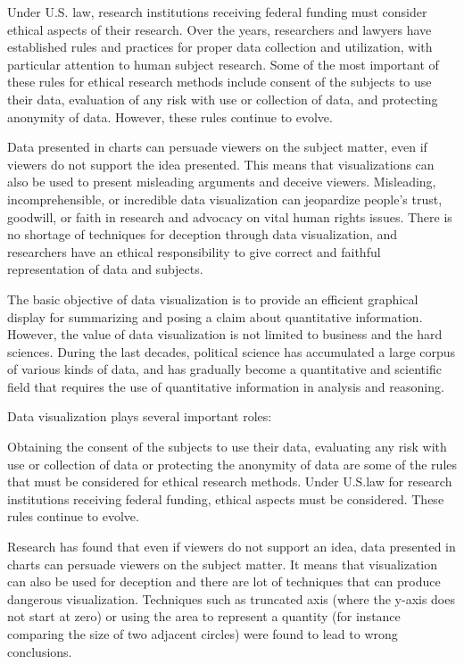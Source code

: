 \documentclass[]{book}
\theoremstyle{definition}
\theoremstyle{definition}
\theoremstyle{definition}
\theoremstyle{remark}
\begin{document}
Under U.S. law, research institutions receiving federal funding must
consider ethical aspects of their research. Over the years, researchers
and lawyers have established rules and practices for proper data
collection and utilization, with particular attention to human subject
research. Some of the most important of these rules for ethical research
methods include consent of the subjects to use their data, evaluation of
any risk with use or collection of data, and protecting anonymity of
data. However, these rules continue to evolve.

Data presented in charts can persuade viewers on the subject matter,
even if viewers do not support the idea presented. This means that
visualizations can also be used to present misleading arguments and
deceive viewers. Misleading, incomprehensible, or incredible data
visualization can jeopardize people's trust, goodwill, or faith in
research and advocacy on vital human rights issues. There is no shortage
of techniques for deception through data visualization, and researchers
have an ethical responsibility to give correct and faithful
representation of data and subjects.

The basic objective of data visualization is to provide an efficient
graphical display for summarizing and posing a claim about quantitative
information. However, the value of data visualization is not limited to
business and the hard sciences. During the last decades, political
science has accumulated a large corpus of various kinds of data, and has
gradually become a quantitative and scientific field that requires the
use of quantitative information in analysis and reasoning.

Data visualization plays several important roles:

Obtaining the consent of the subjects to use their data, evaluating any
risk with use or collection of data or protecting the anonymity of data
are some of the rules that must be considered for ethical research
methods. Under U.S.law for research institutions receiving federal
funding, ethical aspects must be considered. These rules continue to
evolve.

Research has found that even if viewers do not support an idea, data
presented in charts can persuade viewers on the subject matter. It means
that visualization can also be used for deception and there are lot of
techniques that can produce dangerous visualization. Techniques such as
truncated axis (where the y-axis does not start at zero) or using the
area to represent a quantity (for instance comparing the size of two
adjacent circles) were found to lead to wrong conclusions.
\end{document}
